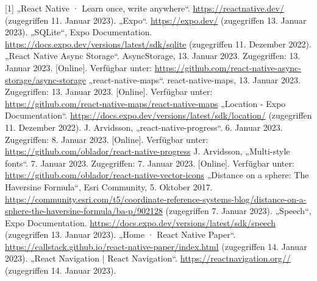 \documentclass[12pt,oneside]{report}
\begin{document}
  \begin{thebibliography}{10}
     [1] „React Native · Learn once, write anywhere“. \url{https://reactnative.dev/} (zugegriffen 11. Januar 2023).
     „Expo“. \url{https://expo.dev/} (zugegriffen 13. Januar 2023).
     „SQLite“, Expo Documentation. \url{https://docs.expo.dev/versions/latest/sdk/sqlite} (zugegriffen 11. Dezember 2022).
     „React Native Async Storage“. AsyncStorage, 13. Januar 2023. Zugegriffen: 13. Januar 2023. [Online]. Verfügbar unter: \url{https://github.com/react-native-async-storage/async-storage}
     „react-native-maps“. react-native-maps, 13. Januar 2023. Zugegriffen: 13. Januar 2023. [Online]. Verfügbar unter: \url{https://github.com/react-native-maps/react-native-maps}
     „Location - Expo Documentation“. \url{https://docs.expo.dev/versions/latest/sdk/location/} (zugegriffen 11. Dezember 2022).
     J. Arvidsson, „react-native-progress“. 6. Januar 2023. Zugegriffen: 8. Januar 2023. [Online]. Verfügbar unter: \url{https://github.com/oblador/react-native-progress}
     J. Arvidsson, „Multi-style fonts“. 7. Januar 2023. Zugegriffen: 7. Januar 2023. [Online]. Verfügbar unter: \url{https://github.com/oblador/react-native-vector-icons}
     „Distance on a sphere: The Haversine Formula“, Esri Community, 5. Oktober 2017. \url{https://community.esri.com/t5/coordinate-reference-systems-blog/distance-on-a-sphere-the-haversine-formula/ba-p/902128} (zugegriffen 7. Januar 2023).
     „Speech“, Expo Documentation. \url{https://docs.expo.dev/versions/latest/sdk/speech} (zugegriffen 13. Januar 2023).
     „Home · React Native Paper“. \url{https://callstack.github.io/react-native-paper/index.html} (zugegriffen 14. Januar 2023).
     „React Navigation | React Navigation“. \url{https://reactnavigation.org//} (zugegriffen 14. Januar 2023).
    
    
    
    
    
    
    
    
    
    
    
  \end{thebibliography}
  \newpage
  
  \listoffigures
  \newpage
  
  \lstlistoflistings
  \newpage

  
\end{document}
